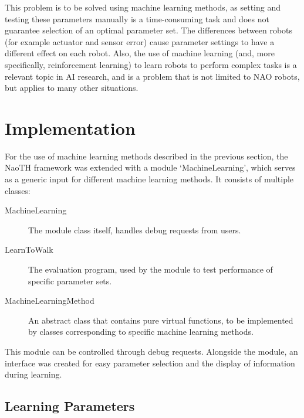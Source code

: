 \documentclass{article}
\begin{document}
This problem is to be solved using machine learning methods, as setting and
testing these parameters manually is a time-consuming task and does not
guarantee selection of an optimal parameter set. The differences between robots
(for example actuator and sensor error) cause parameter settings to have a
different effect on each robot. Also, the use of machine learning (and, more
specifically, reinforcement learning) to learn robots to perform complex tasks
is a relevant topic in AI research, and is a problem that is not limited to NAO
robots, but applies to many other situations. 


\section{Implementation}
For the use of machine learning methods described in the previous section, the NaoTH framework was extended with a module `MachineLearning', which serves as a generic input for different machine learning methods. It consists of multiple classes:

\begin{description}
\item[MachineLearning] The module class itself, handles debug requests from users.
\item[LearnToWalk] The evaluation program, used by the module to test performance of specific parameter sets.
\item[MachineLearningMethod] An abstract class that contains pure virtual functions, to be implemented by classes corresponding to specific machine learning methods.
\end{description}

This module can be controlled through debug requests. Alongside the module, an interface was created for easy parameter selection and the display of information during learning.

\subsection{Learning Parameters}
\end{document}
